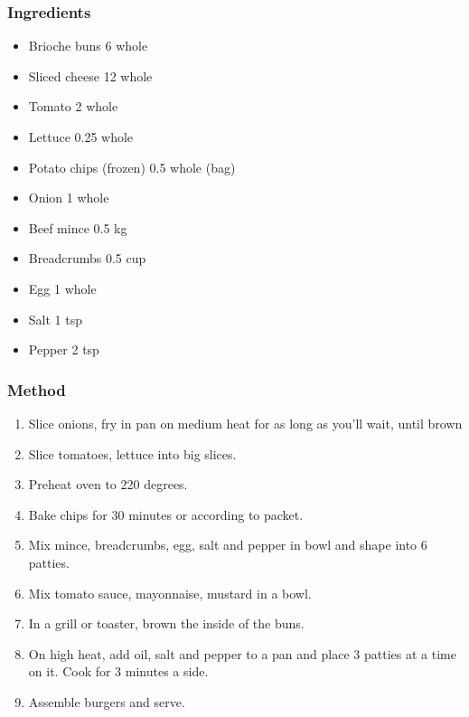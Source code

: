 \documentclass[]{article}
\begin{document}
\subsubsection*{\Large Ingredients}
\begin{multicols}{2}
\begin{itemize}
 \item Brioche buns \hfill 6 whole
 \item Sliced cheese \hfill 12 whole
 \item Tomato \hfill 2 whole
 \item Lettuce \hfill 0.25 whole
 \item Potato chips (frozen) \hfill 0.5 whole (bag)
 \item Onion \hfill 1 whole
 \item Beef mince \hfill 0.5 kg
 \item Breadcrumbs \hfill 0.5 cup
 \item Egg \hfill 1 whole
 \item Salt \hfill 1 tsp
 \item Pepper \hfill 2 tsp
\end{itemize}
\end{multicols}
\subsubsection*{\Large Method}
\begin{enumerate}[font=\huge\color{accent}]
	\item Slice onions, fry in pan on medium heat for as long as you'll wait, until brown
	\item Slice tomatoes, lettuce into big slices.
	\item Preheat oven to 220 degrees.
	\item Bake chips for 30 minutes or according to packet.
	\item Mix mince, breadcrumbs, egg, salt and pepper in bowl and shape into 6 patties.
	\item Mix tomato sauce, mayonnaise, mustard in a bowl.
	\item In a grill or toaster, brown the inside of the buns.
	\item On high heat, add oil, salt and pepper to a pan and place 3 patties at a time on it. Cook for 3 minutes a side.
	\item Assemble burgers and serve.
\end{enumerate}
\newpage
{}\label{rec:Lentil Burgers}
\end{document}
